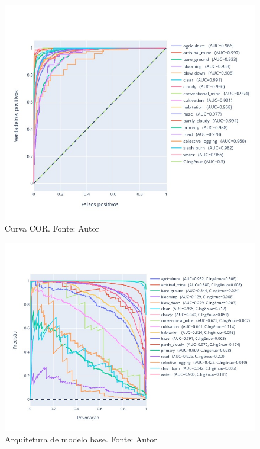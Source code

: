 \begin{figure}[!ht]
    \centering
    \includegraphics[width=\columnwidth]{Imagens/results/rsp-swin-t_planet_pt/Curva COR por classe.jpg}
    \caption{ Curva COR.
    Fonte: Autor}
    \label{fig:AnexosCurvaCORTodasSwin}
\end{figure}    

\begin{figure}[!ht]
    \centering
    \includegraphics[width=\columnwidth]{Imagens/results/rsp-swin-t_planet_pt/Curva PR por classe.jpg}
    \caption{ Arquitetura de modelo base.
    Fonte: Autor}
    \label{fig:AnexosCurvaPRTodasSwin}
\end{figure}  



